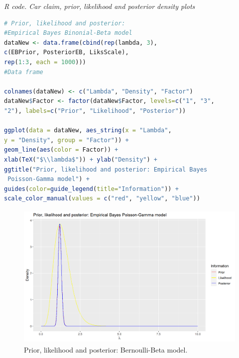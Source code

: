 \begin{enumerate}[leftmargin=*]
\begin{tcolorbox}[enhanced,width=4.67in,center upper,
fontupper=\large\bfseries,drop shadow southwest,sharp corners]
\textit{R code. Car claim, prior, likelihood and posterior density plots}
\begin{VF}
\begin{lstlisting}[language=R]
# Prior, likelihood and posterior: 
#Empirical Bayes Binonial-Beta model
dataNew <- data.frame(cbind(rep(lambda, 3), 
c(EBPrior, PosteriorEB, LiksScale),
rep(1:3, each = 1000))) 
#Data frame

colnames(dataNew) <- c("Lambda", "Density", "Factor")
dataNew$Factor <- factor(dataNew$Factor, levels=c("1", "3", 
"2"), labels=c("Prior", "Likelihood", "Posterior"))

ggplot(data = dataNew, aes_string(x = "Lambda", 
y = "Density", group = "Factor")) + 
geom_line(aes(color = Factor)) +
xlab(TeX("$\\lambda$")) + ylab("Density") +
ggtitle("Prior, likelihood and posterior: Empirical Bayes
 Poisson-Gamma model") +
guides(color=guide_legend(title="Information")) +
scale_color_manual(values = c("red", "yellow", "blue"))

\end{lstlisting}
\end{VF}
\end{tcolorbox}

\begin{figure}[!h]
	\includegraphics[width=340pt, height=200pt]{Chapters/chapter1/figures/piorlikepost.png}
	\caption[List of figure caption goes here]{Prior, likelihood and posterior: Bernoulli-Beta model.}\label{fig12}
\end{figure}



\end{enumerate}
